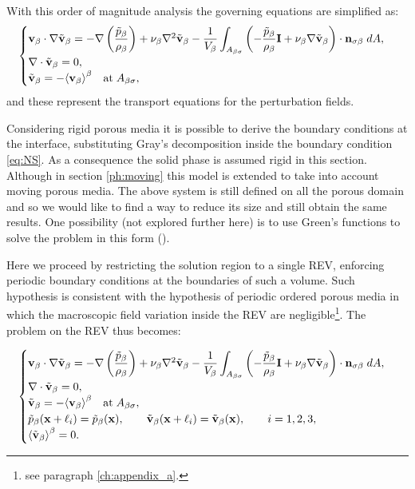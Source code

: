 With this order of magnitude analysis the governing equations are simplified as:
\begin{eqnarray}
	\begin{cases}
		\textbf{v}_{\beta} \cdot \nabla \tilde{\textbf{v}}_{\beta} = -\nabla \left(\dfrac{\tilde{p}_{\beta}}{\rho_{\beta}}\right) + \nu_{\beta} \nabla^2 \tilde{\textbf{v}}_{\beta} - \dfrac{1}{V_\beta} \displaystyle \int_{A_{\beta \sigma}} \left(-\dfrac{\tilde{p}_{\beta}}{\rho_{\beta}} \mathbf{I}  + \nu_{\beta} \nabla \tilde{\textbf{v}}_{\beta} \right) \cdot \mathbf{n}_{\sigma \beta} \;dA,  \\
		\nabla \cdot \tilde{\textbf{v}}_{\beta} = 0,  \\
		\tilde{\textbf{v}}_{\beta} = -{\left< \textbf{v}_{\beta} \right>}^{\beta} \quad \textrm{at} \; A_{\beta \sigma},
	\end{cases}
\label{eq:vans_mom_}
\end{eqnarray}
and these represent the transport equations for the perturbation fields.

Considering rigid porous media it is possible to derive the boundary conditions at the interface, substituting Gray's decomposition inside the boundary condition  \eqref{eq:NS}. As a consequence the solid phase is assumed rigid in this section. Although in section \ref{ph:moving} this model is extended to take into account moving porous media.
The above system is still defined on all the porous domain and so we would like to find a way to reduce its size and still obtain the same results.
One possibility (not explored further here) is to use Green's functions to solve the problem in this form (\citet{wood2013volume}).

Here we proceed by restricting the solution region to a single REV, enforcing periodic boundary conditions at the boundaries of such a volume.
Such hypothesis is consistent with the hypothesis of periodic ordered porous media in which the macroscopic field variation inside the REV are negligible\footnote{see paragraph \ref{ch:appendix_a}.}.
The problem on the REV thus becomes:

\begin{eqnarray}
\begin{cases}
\textbf{v}_{\beta} \cdot \nabla \tilde{\textbf{v}}_{\beta} = -\nabla \left(\dfrac{\tilde{p}_{\beta}}{\rho_{\beta}}\right) + \nu_{\beta} \nabla^2 \tilde{\textbf{v}}_{\beta} - \dfrac{1}{V_\beta} \displaystyle \int_{A_{\beta \sigma}} \left(-\dfrac{\tilde{p}_{\beta}}{\rho_{\beta}} \mathbf{I}  + \nu_{\beta} \nabla \tilde{\textbf{v}}_{\beta} \right) \cdot \mathbf{n}_{\sigma \beta} \;dA,  \\
\nabla \cdot \tilde{\textbf{v}}_{\beta} = 0, \\
\tilde{\textbf{v}}_{\beta} = -{\left< \textbf{v}_{\beta} \right>}^{\beta} \quad \textrm{at} \; A_{\beta \sigma}, \\
\tilde{p}_{\beta}(\mathbf{x} +\ell_i) = \tilde{p}_{\beta}(\mathbf{x}), \qquad \tilde{\textbf{v}}_{\beta}(\mathbf{x} +\ell_i) = \tilde{\textbf{v}}_{\beta}(\mathbf{x}), \qquad i=1,2,3 ,\\
{\left< \tilde{\textbf{v}}_{\beta} \right>}^{\beta} = 0.
\end{cases}
\label{eq:vans_mom_2}
\end{eqnarray}

